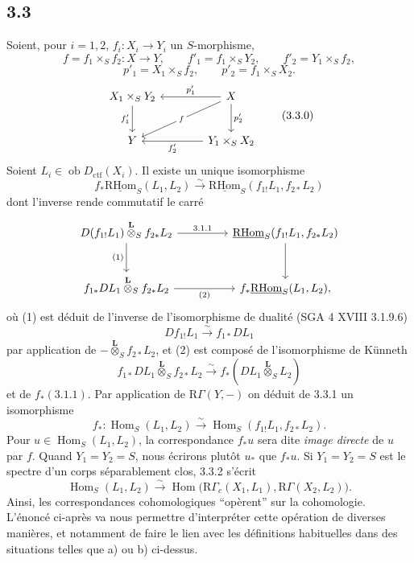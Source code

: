 \documentclass[11pt]{article}
\DeclareMathOperator{\Hom}{Hom}
\newcommand{\R}{\mathrm{R}}\newcommand{\RHomCore}{\mathrm{RHom}}
\newcommand{\ob}{\operatorname{ob}}
\providecommand{\RHom}{\RHomCore}
\providecommand{\uRHom}{\underline{\RHom}}
\providecommand{\Dctf}{D_{\mathrm{ctf}}}
\providecommand{\Dctf}{D_{\mathrm{ctf}}}
\providecommand{\RHom}{\RHomCore}
\providecommand{\Hom}{\operatorname{Hom}}
\providecommand{\ob}{\operatorname{ob}}
\providecommand{\RHom}{\R\mathcal{H}om}
\providecommand{\R}{\mathrm R}
\providecommand{\RHom}{\RHomCore}
\providecommand{\Hom}{\operatorname{Hom}}
\begin{document}
\subsection*{3.3}
Soient, pour $i=1,2$, $f_i:X_i\to Y_i$ un $S$-morphisme,
\[
f=f_1\times_S f_2:X\to Y,
\qquad
f'_1=f_1\times_S Y_2,
\qquad
f'_2=Y_1\times_S f_2,
\]
\[
p'_1=X_1\times_S f_2,
\qquad
p'_2=f_1\times_S X_2.
\]
\begin{equation}
\begin{tikzcd}[column sep=3.8em,row sep=2.4em]
X_1\times_S Y_2 \arrow[d,"f'_1"'] & X \arrow[l,"p'_1"'] \arrow[dl,"f" description] \arrow[d,"p'_2"] \\
Y & Y_1\times_S X_2 \arrow[l,"f'_2"]
\end{tikzcd}
\tag{3.3.0}
\end{equation}
Soient $L_i\in\ob\Dctf(X_i)$. Il existe un unique isomorphisme
\begin{equation}
f_*\uRHom_S(L_1,L_2)
\xrightarrow{\sim}
\uRHom_S(f_{1!}L_1,f_{2*}L_2)
\tag{3.3.1}
\end{equation}
dont l'inverse rende commutatif le carré
\[
\begin{tikzcd}[column sep=4.5em,row sep=2.6em]
D(f_{1!}L_1)\overset{\mathbf L}{\otimes}_S f_{2*}L_2
  \arrow[r,"3.1.1"] \arrow[d,"(1)"']
& \uRHom_S(f_{1!}L_1,f_{2*}L_2) \arrow[d] \\
f_{1*}DL_1\overset{\mathbf L}{\otimes}_S f_{2*}L_2
  \arrow[r,"(2)"']
& f_*\uRHom_S(L_1,L_2),
\end{tikzcd}
\]
où (1) est déduit de l'inverse de l'isomorphisme de dualité (SGA 4 XVIII 3.1.9.6)
\[
Df_{1!}L_1\xrightarrow{\sim}f_{1*}DL_1
\]
par application de $-\overset{\mathbf L}{\otimes}_S f_{2*}L_2$, et (2) est composé de l'isomorphisme de Künneth
\[
f_{1*}DL_1\overset{\mathbf L}{\otimes}_S f_{2*}L_2
\xrightarrow{\sim}
f_*(DL_1\overset{\mathbf L}{\otimes}_S L_2)
\]
et de $f_*(3.1.1)$. Par application de $\R\Gamma(Y,-)$ on déduit de 3.3.1 un isomorphisme
\begin{equation}
f_*:\Hom_S(L_1,L_2)
\xrightarrow{\sim}
\Hom_S(f_{1!}L_1,f_{2*}L_2).
\tag{3.3.2}
\end{equation}
Pour $u\in\Hom_S(L_1,L_2)$, la correspondance $f_*u$ sera dite \emph{image directe} de $u$ par $f$. Quand $Y_1=Y_2=S$, nous écrirons plutôt $u_*$ que $f_*u$. Si $Y_1=Y_2=S$ est le spectre d'un corps séparablement clos, 3.3.2 s'écrit
\begin{equation}
\Hom_S(L_1,L_2)
\xrightarrow{\sim}
\Hom\bigl(\R\Gamma_c(X_1,L_1),\R\Gamma(X_2,L_2)\bigr).
\tag{3.3.3}
\end{equation}
Ainsi, les correspondances cohomologiques ``opèrent'' sur la cohomologie. L'énoncé ci-après va nous permettre d'interpréter cette opération de diverses manières, et notamment de faire le lien avec les définitions habituelles dans des situations telles que a) ou b) ci-dessus.
\end{document}
